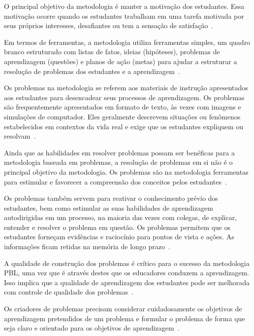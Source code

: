 O principal objetivo da metodologia é manter a motivação
dos estudantes.
Essa motivação ocorre quando os estudantes trabalham em
uma tarefa motivada por seus próprios interesses, desafiantes
ou tem a sensação de satisfação~\cite{hmelo2004problem}.

Em termos de ferramentas, a metodologia utiliza ferramentas simples,
um quadro branco estruturado com listas de fatos,
ideias (hipóteses), problemas de aprendizagem (questões)
e planos de ação (metas) para ajudar a estruturar a
resolução de problemas dos estudantes e a
aprendizagem~\cite{hmelo2004problem}. 

Os problemas na metodologia se referem aos materiais de instrução apresentados
aos estudantes para desencadear seus processos de aprendizagem.
Os problemas são frequentemente apresentados em formato de texto,
às vezes com imagens e simulações de computador.
Eles geralmente descrevem situações ou fenômenos estabelecidos
em contextos da vida real e exige que os estudantes expliquem ou
resolvam~\cite{hmelo2004problem}.

Ainda que as habilidades em resolver problemas possam ser benéficas
para a metodologia baseada em problemas, a resolução de problemas em si não é o
principal objetivo da metodologia.
Os problemas são na metodologia ferramentas para estimular e
favorecer a compreensão dos conceitos pelos
estudantes~\cite{wood2003problem, amos1998problem}.

Os problemas também servem para reativar o conhecimento prévio dos
estudantes, bem como estimular as suas habilidades de aprendizagem
autodirigidas em um processo, na maioria das vezes com colegas,
de explicar, entender e resolver o problema em
questão.
Os problemas permitem que os estudantes forneçam evidências
e raciocínio para pontos de vista e ações.
As informações ficam retidas na memória de longo
prazo~\cite{des1999delphi, azer2012twelve}.

A qualidade de construção dos problemas é crítico para o
sucesso da metodologia \ac{PBL}, uma vez que é através destes
que os educadores conduzem a
aprendizagem.
Isso implica que a qualidade de aprendizagem dos estudantes
pode ser melhorada com controle de qualidade dos
problemas~\cite{santos2009analisa,des1999delphi,dolmans1997seven}.

Os criadores de problemas precisam considerar cuidadosamente
os objetivos de aprendizagem pretendidos de um problema
e formular o problema de forma que seja claro e
orientado para os objetivos
de aprendizagem~\cite{sockalingam2011student}.

